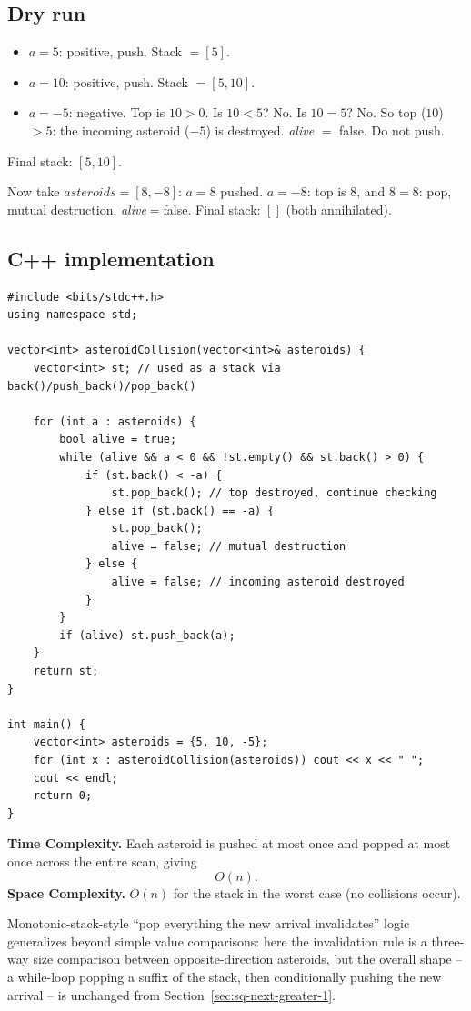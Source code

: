 \subsection*{Dry run}


\begin{itemize}
  \item $a=5$: positive, push. Stack $=[5]$.
  \item $a=10$: positive, push. Stack $=[5,10]$.
  \item $a=-5$: negative. Top is $10>0$. Is $10 < 5$? No. Is $10=5$?
        No. So top ($10$) $> 5$: the incoming asteroid ($-5$) is
        destroyed. \textit{alive} $=$ false. Do not push.
\end{itemize}

Final stack: $[5,10]$.

Now take $\textit{asteroids} = [8,-8]$: $a=8$ pushed. $a=-8$: top is $8$,
and $8 = 8$: pop, mutual destruction, \textit{alive}$=$false. Final
stack: $[]$ (both annihilated).

\subsection*{C++ implementation}

\begin{lstlisting}
#include <bits/stdc++.h>
using namespace std;

vector<int> asteroidCollision(vector<int>& asteroids) {
    vector<int> st; // used as a stack via back()/push_back()/pop_back()

    for (int a : asteroids) {
        bool alive = true;
        while (alive && a < 0 && !st.empty() && st.back() > 0) {
            if (st.back() < -a) {
                st.pop_back(); // top destroyed, continue checking
            } else if (st.back() == -a) {
                st.pop_back();
                alive = false; // mutual destruction
            } else {
                alive = false; // incoming asteroid destroyed
            }
        }
        if (alive) st.push_back(a);
    }
    return st;
}

int main() {
    vector<int> asteroids = {5, 10, -5};
    for (int x : asteroidCollision(asteroids)) cout << x << " ";
    cout << endl;
    return 0;
}
\end{lstlisting}

\begin{complexitybox}
\textbf{Time Complexity.} Each asteroid is pushed at most once and popped
at most once across the entire scan, giving
\[
  O(n).
\]
\textbf{Space Complexity.} $O(n)$ for the stack in the worst case (no
collisions occur).
\end{complexitybox}

\begin{takeawaybox}
Monotonic-stack-style ``pop everything the new arrival invalidates''
logic generalizes beyond simple value comparisons: here the invalidation
rule is a three-way size comparison between opposite-direction asteroids,
but the overall shape -- a while-loop popping a suffix of the stack, then
conditionally pushing the new arrival -- is unchanged from
Section~\ref{sec:sq-next-greater-1}.
\end{takeawaybox}
